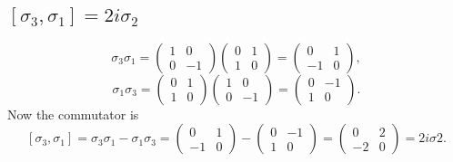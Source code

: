 \documentclass[10pt]{article}
\begin{document}
\subsection{$[\sigma_3, \sigma_1] = 2i\sigma_2$}
\[
\sigma_3 \sigma_1 = 
\begin{pmatrix}
1 & 0 \\
0 & -1
\end{pmatrix}
\begin{pmatrix}
0 & 1 \\
1 & 0 
\end{pmatrix}
=
\begin{pmatrix}
0 & 1 \\
-1 & 0
\end{pmatrix},
\]
%
\[ 
\sigma_1 \sigma_3 = 
\begin{pmatrix}
0 & 1 \\
1 & 0 
\end{pmatrix}
\begin{pmatrix}
1 & 0 \\
0 & -1
\end{pmatrix}
=
\begin{pmatrix}
0 & -1 \\
1 & 0
\end{pmatrix}.
\]
Now the commutator is 
\[
[\sigma_3, \sigma_1] = \sigma_3 \sigma_1 - \sigma_1 \sigma_3 =
\begin{pmatrix}
0 & 1 \\
-1 & 0 
\end{pmatrix}
-
\begin{pmatrix}
0 & - 1 \\
1 & 0 
\end{pmatrix}
= 
\begin{pmatrix}
0 & 2 \\
-2 & 0
\end{pmatrix}
= 2i\sigma2.
\]
\end{document}

